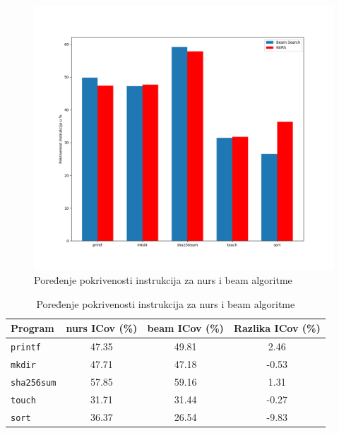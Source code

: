 \documentclass[a4paper]{article}
\begin{document}
\begin{figure}[h!]
    \centering
    \includegraphics[width=\linewidth]{ilustracije/ICov.png}
    \caption{Poređenje pokrivenosti instrukcija za nurs i beam algoritme}
    \label{fig:icov_comparison}
\end{figure}

\begin{table}[h!]
\centering
\begin{tabular}{|l|c|c|c|}
\hline
\textbf{Program} & \textbf{nurs ICov (\%)} & \textbf{beam ICov (\%)} & \textbf{Razlika ICov (\%)} \\ \hline
\texttt{printf} & 47.35 & 49.81 & 2.46 \\ \hline
\texttt{mkdir} & 47.71 & 47.18 & -0.53 \\ \hline
\texttt{sha256sum} & 57.85 & 59.16 & 1.31 \\ \hline
\texttt{touch} & 31.71 & 31.44 & -0.27 \\ \hline
\texttt{sort} & 36.37 & 26.54 & -9.83 \\ \hline
\end{tabular}
\caption{Poređenje pokrivenosti instrukcija za nurs i beam algoritme}
\label{tab:icov_comparison}
\end{table}
\end{document}
